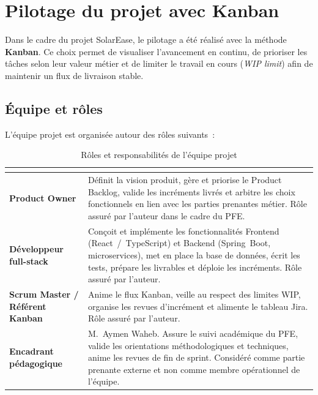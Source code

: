 \section{Pilotage du projet avec Kanban}

Dans le cadre du projet SolarEase, le pilotage a été réalisé avec la méthode
\textbf{Kanban}. Ce choix permet de visualiser l'avancement en continu, de
prioriser les tâches selon leur valeur métier et de limiter le travail en
cours (\textit{WIP limit}) afin de maintenir un flux de livraison stable.

\subsection{Équipe et rôles}

L'équipe projet est organisée autour des rôles suivants~:

\begin{table}[H]
  \centering
  \caption{Rôles et responsabilités de l'équipe projet}
  \label{tab:equipe}
  \small
  \renewcommand{\arraystretch}{1.3}
  \begin{tabularx}{\textwidth}{@{}>{\bfseries}L{4.5cm} X@{}}
    \toprule
     \\
    \midrule
    Product Owner &
      Définit la vision produit, gère et priorise le Product Backlog,
      valide les incréments livrés et arbitre les choix fonctionnels en
      lien avec les parties prenantes métier. Rôle assuré par l'auteur
      dans le cadre du PFE. \\
    \addlinespace
    Développeur full-stack &
      Conçoit et implémente les fonctionnalités Frontend
      (React~/~TypeScript) et Backend (Spring~Boot, microservices), met
      en place la base de données, écrit les tests, prépare les
      livrables et déploie les incréments. Rôle assuré par l'auteur. \\
    \addlinespace
    Scrum Master / Référent Kanban &
      Anime le flux Kanban, veille au respect des limites WIP, organise
      les revues d'incrément et alimente le tableau Jira. Rôle assuré
      par l'auteur. \\
    \addlinespace
    Encadrant pédagogique &
      M.~Aymen Waheb. Assure le suivi académique du PFE, valide les
      orientations méthodologiques et techniques, anime les revues de
      fin de sprint. Considéré comme partie prenante externe et non
      comme membre opérationnel de l'équipe. \\
    \bottomrule
  \end{tabularx}
\end{table}

